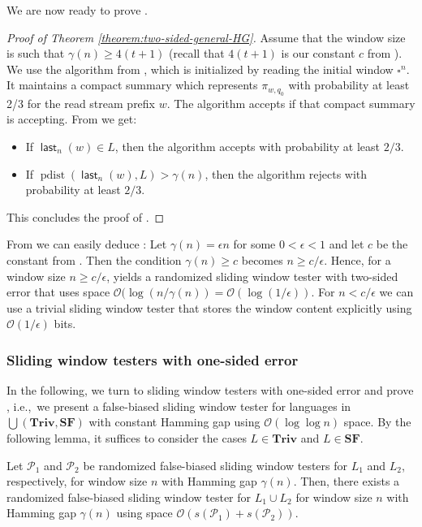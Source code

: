 \documentclass{article}\usepackage[a4paper,margin=20mm]{geometry}
\renewcommand{\O}{\mathcal{O}}
\renewcommand{\P}{\mathcal{P}}
\DeclareMathOperator{\last}{\mathsf{last}}
\DeclareMathOperator{\pdist}{pdist}
\newcommand{\Triv}{\mathbf{Triv}}
\newcommand{\SF}{\mathbf{SF}}
\renewcommand{\geq}{\geqslant}
\renewcommand{\ge}{\geq}
\begin{document}
We are now ready to prove .

\begin{proof}[Proof of Theorem \ref{theorem:two-sided-general-HG}]
Assume that the window size is such that $\gamma(n) \ge 4(t+1)$ (recall that $4(t+1)$ is our constant $c$ from ).
We use the algorithm from , which is initialized by reading the initial window $\square^n$.
It maintains a compact summary which represents $\pi_{w,q_0}$ with probability at least 2/3
for the read stream prefix $w$.
The algorithm accepts if that compact summary is accepting.
From  
we get:
\begin{itemize}
\item If $\last_n(w) \in L$, then the algorithm accepts with probability at least $2/3$.
\item If $\pdist(\last_n(w),L) > \gamma(n)$, then the algorithm rejects with probability at least $2/3$.
\end{itemize}
This concludes the proof of .
\end{proof}
From  we can easily deduce : 
Let $\gamma(n) = \epsilon n$ for some $0 < \epsilon < 1$ and let $c$ be the constant from 
. Then the condition $\gamma(n) \ge c$ becomes $n \geq c/\epsilon$.
Hence, for a window size $n \geq c/\epsilon$,  yields a randomized
sliding window tester with two-sided error that uses space $\O(\log(n/\gamma(n)) = \O(\log(1/\epsilon))$.
For $n < c/\epsilon$ we can use a trivial sliding window tester that stores the window content explicitly using
$\O(1/\epsilon)$ bits.


\subsubsection{Sliding window testers with one-sided error}\label{sec:one-sided_ub}

In the following, we turn to sliding window testers with one-sided error
and prove , i.e.,~we present a false-biased sliding window tester
for languages in $\bigcup(\Triv, \SF)$ with constant Hamming gap using $\O(\log \log n)$ space.
By the following lemma, it suffices to consider the cases $L \in \Triv$ and $L \in \SF$.

\begin{lemma}
	\label{lem:pt-union}
	Let $\P_1$ and $\P_2$ be randomized false-biased sliding window testers for $L_1$ and $L_2$, respectively,
	for window size $n$ with Hamming gap $\gamma(n)$.
	Then, there exists a randomized false-biased sliding window tester for $L_1 \cup L_2$ for window size $n$
	with Hamming gap $\gamma(n)$ using space $\O(s(\P_1) + s(\P_2))$.
\end{lemma}
\end{document}
